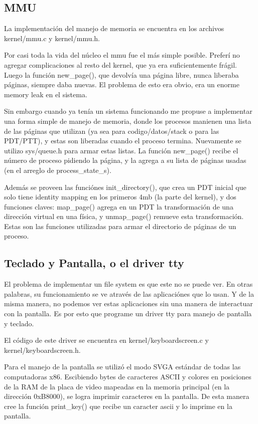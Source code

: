\subsection{MMU}

La implementación del manejo de memoria se encuentra en los archivos
kernel/mmu.c y kernel/mmu.h.

Por casi toda la vida del núcleo el mmu fue el más simple posible. Preferí no
agregar complicaciones al resto del kernel, que ya era suficientemente frágil.
Luego la función new\_page(), que devolvía una página libre, nunca liberaba
páginas, siempre daba nuevas. El problema de esto era obvio, era un enorme
memory leak en el sistema.

Sin embargo cuando ya tenía un sistema funcionando me propuse a implementar una
forma simple de manejo de memoria, donde los procesos manienen una lista de las
páginas que utilizan (ya sea para codigo/datos/stack o para las PDT/PTT), y
estas son liberadas cuando el proceso termina. Nuevamente se utilizo
sys/queue.h para armar estas listas. La función new\_page() recibe el número de
proceso pidiendo la página, y la agrega a su lista de páginas usadas (en el
arreglo de process\_state\_s).

Además se proveen las funciónes init\_directory(), que crea un PDT inicial que
solo tiene identity mapping en los primeros 4mb (la parte del kernel), y dos
funciones claves: map\_page() agrega en un PDT la transformación de una
dirección virtual en una física, y unmap\_page() remueve esta transformación.
Estas son las funciones utilizadas para armar el directorio de páginas de un
proceso.

\subsection{Teclado y Pantalla, o el driver tty}

El problema de implementar un file system es que este no se puede ver. En otras
palabras, su funcionamiento se ve através de las aplicaciónes que lo usan. Y de
la misma manera, no podemos ver estas aplicaciones sin una manera de
interactuar con la pantalla. Es por esto que programe un driver tty para manejo
de pantalla y teclado.

El código de este driver se encuentra en kernel/keyboardscreen.c y
kernel/keyboardscreen.h.

Para el manejo de la pantalla se utilizó el modo SVGA estándar de todas las
computadoras x86. Escibiendo bytes de caracteres ASCII y colores en posiciones
de la RAM de la placa de video mapeadas en la memoria principal (en la
dirección 0xB8000), se logra imprimir caracteres en la pantalla. De esta manera
cree la función print\_key() que recibe un caracter ascii y lo imprime en la
pantalla.

